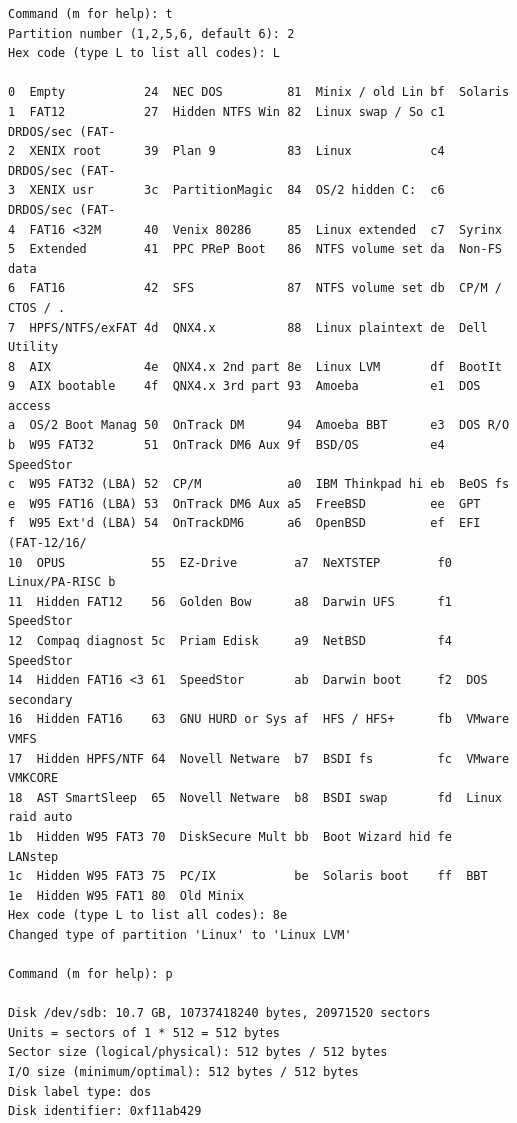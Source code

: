 \vspace{-15pt}
\begin{verbatim}
Command (m for help): t
Partition number (1,2,5,6, default 6): 2
Hex code (type L to list all codes): L

0  Empty           24  NEC DOS         81  Minix / old Lin bf  Solaris        
1  FAT12           27  Hidden NTFS Win 82  Linux swap / So c1  DRDOS/sec (FAT-
2  XENIX root      39  Plan 9          83  Linux           c4  DRDOS/sec (FAT-
3  XENIX usr       3c  PartitionMagic  84  OS/2 hidden C:  c6  DRDOS/sec (FAT-
4  FAT16 <32M      40  Venix 80286     85  Linux extended  c7  Syrinx         
5  Extended        41  PPC PReP Boot   86  NTFS volume set da  Non-FS data    
6  FAT16           42  SFS             87  NTFS volume set db  CP/M / CTOS / .
7  HPFS/NTFS/exFAT 4d  QNX4.x          88  Linux plaintext de  Dell Utility   
8  AIX             4e  QNX4.x 2nd part 8e  Linux LVM       df  BootIt         
9  AIX bootable    4f  QNX4.x 3rd part 93  Amoeba          e1  DOS access     
a  OS/2 Boot Manag 50  OnTrack DM      94  Amoeba BBT      e3  DOS R/O        
b  W95 FAT32       51  OnTrack DM6 Aux 9f  BSD/OS          e4  SpeedStor      
c  W95 FAT32 (LBA) 52  CP/M            a0  IBM Thinkpad hi eb  BeOS fs        
e  W95 FAT16 (LBA) 53  OnTrack DM6 Aux a5  FreeBSD         ee  GPT            
f  W95 Ext'd (LBA) 54  OnTrackDM6      a6  OpenBSD         ef  EFI (FAT-12/16/
10  OPUS            55  EZ-Drive        a7  NeXTSTEP        f0  Linux/PA-RISC b
11  Hidden FAT12    56  Golden Bow      a8  Darwin UFS      f1  SpeedStor      
12  Compaq diagnost 5c  Priam Edisk     a9  NetBSD          f4  SpeedStor      
14  Hidden FAT16 <3 61  SpeedStor       ab  Darwin boot     f2  DOS secondary  
16  Hidden FAT16    63  GNU HURD or Sys af  HFS / HFS+      fb  VMware VMFS    
17  Hidden HPFS/NTF 64  Novell Netware  b7  BSDI fs         fc  VMware VMKCORE 
18  AST SmartSleep  65  Novell Netware  b8  BSDI swap       fd  Linux raid auto
1b  Hidden W95 FAT3 70  DiskSecure Mult bb  Boot Wizard hid fe  LANstep        
1c  Hidden W95 FAT3 75  PC/IX           be  Solaris boot    ff  BBT            
1e  Hidden W95 FAT1 80  Old Minix      
Hex code (type L to list all codes): 8e
Changed type of partition 'Linux' to 'Linux LVM'

Command (m for help): p

Disk /dev/sdb: 10.7 GB, 10737418240 bytes, 20971520 sectors
Units = sectors of 1 * 512 = 512 bytes
Sector size (logical/physical): 512 bytes / 512 bytes
I/O size (minimum/optimal): 512 bytes / 512 bytes
Disk label type: dos
Disk identifier: 0xf11ab429


\end{verbatim}
